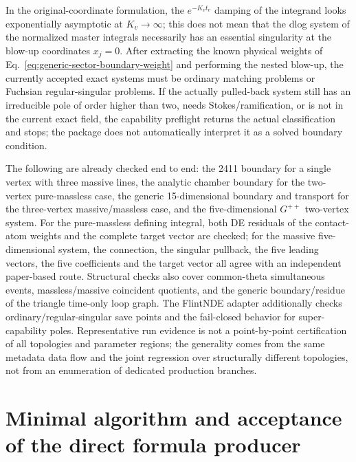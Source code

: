 \documentclass[11pt,a4paper]{article}
\begin{document}
In the original-coordinate formulation, the $e^{-K_vt_v}$ damping of the integrand looks exponentially asymptotic at $K_v\to\infty$; this does not mean that the dlog system of the normalized master integrals necessarily has an essential singularity at the blow-up coordinates $x_j=0$. After extracting the known physical weights of Eq.~\eqref{eq:generic-sector-boundary-weight} and performing the nested blow-up, the currently accepted exact systems must be ordinary matching problems or Fuchsian regular-singular problems. If the actually pulled-back system still has an irreducible pole of order higher than two, needs Stokes/ramification, or is not in the current exact field, the capability preflight returns the actual classification and stops; the package does not automatically interpret it as a solved boundary condition.

The following are already checked end to end: the 2411 boundary for a single vertex with three massive lines, the analytic chamber boundary for the two-vertex pure-massless case, the generic 15-dimensional boundary and transport for the three-vertex massive/massless case, and the five-dimensional $G^{++}$ two-vertex system. For the pure-massless defining integral, both DE residuals of the contact-atom weights and the complete target vector are checked; for the massive five-dimensional system, the connection, the singular pullback, the five leading vectors, the five coefficients and the target vector all agree with an independent paper-based route. Structural checks also cover common-theta simultaneous events, massless/massive coincident quotients, and the generic boundary/residue of the triangle time-only loop graph. The FlintNDE adapter additionally checks ordinary/regular-singular save points and the fail-closed behavior for super-capability poles. Representative run evidence is not a point-by-point certification of all topologies and parameter regions; the generality comes from the same metadata data flow and the joint regression over structurally different topologies, not from an enumeration of dedicated production branches.

\section{Minimal algorithm and acceptance of the direct formula producer}
\end{document}
